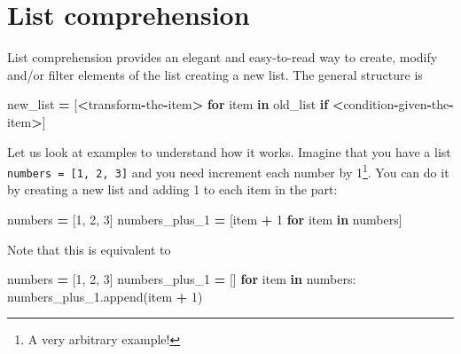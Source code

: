 \documentclass[
]{book}
\newenvironment{Shaded}{\begin{snugshade}}{\end{snugshade}}
\newcommand{\ControlFlowTok}[1]{\textcolor[rgb]{0.13,0.29,0.53}{\textbf{#1}}}
\newcommand{\DecValTok}[1]{\textcolor[rgb]{0.00,0.00,0.81}{#1}}
\newcommand{\KeywordTok}[1]{\textcolor[rgb]{0.13,0.29,0.53}{\textbf{#1}}}
\newcommand{\NormalTok}[1]{#1}
\newcommand{\OperatorTok}[1]{\textcolor[rgb]{0.81,0.36,0.00}{\textbf{#1}}}
\begin{document}
\hypertarget{list-comprehension}{%
\section{List comprehension}\label{list-comprehension}}

List comprehension provides an elegant and easy-to-read way to create, modify and/or filter elements of the list creating a new list. The general structure is

\begin{Shaded}
\begin{Highlighting}[]
\NormalTok{new\_list }\OperatorTok{=}\NormalTok{ [}\OperatorTok{\textless{}}\NormalTok{transform}\OperatorTok{{-}}\NormalTok{the}\OperatorTok{{-}}\NormalTok{item}\OperatorTok{\textgreater{}} \ControlFlowTok{for}\NormalTok{ item }\KeywordTok{in}\NormalTok{ old\_list }\ControlFlowTok{if} \OperatorTok{\textless{}}\NormalTok{condition}\OperatorTok{{-}}\NormalTok{given}\OperatorTok{{-}}\NormalTok{the}\OperatorTok{{-}}\NormalTok{item}\OperatorTok{\textgreater{}}\NormalTok{]}
\end{Highlighting}
\end{Shaded}

Let us look at examples to understand how it works. Imagine that you have a list \texttt{numbers\ =\ {[}1,\ 2,\ 3{]}} and you need increment each number by 1\footnote{A very arbitrary example!}. You can do it by creating a new list and adding 1 to each item in the part:

\begin{Shaded}
\begin{Highlighting}[]
\NormalTok{numbers }\OperatorTok{=}\NormalTok{ [}\DecValTok{1}\NormalTok{, }\DecValTok{2}\NormalTok{, }\DecValTok{3}\NormalTok{]}
\NormalTok{numbers\_plus\_1 }\OperatorTok{=}\NormalTok{ [item }\OperatorTok{+} \DecValTok{1} \ControlFlowTok{for}\NormalTok{ item }\KeywordTok{in}\NormalTok{ numbers]}
\end{Highlighting}
\end{Shaded}

Note that this is equivalent to

\begin{Shaded}
\begin{Highlighting}[]
\NormalTok{numbers }\OperatorTok{=}\NormalTok{ [}\DecValTok{1}\NormalTok{, }\DecValTok{2}\NormalTok{, }\DecValTok{3}\NormalTok{]}
\NormalTok{numbers\_plus\_1 }\OperatorTok{=}\NormalTok{ []}
\ControlFlowTok{for}\NormalTok{ item }\KeywordTok{in}\NormalTok{ numbers:}
\NormalTok{    numbers\_plus\_1.append(item }\OperatorTok{+} \DecValTok{1}\NormalTok{)}
\end{Highlighting}
\end{Shaded}
\end{document}
